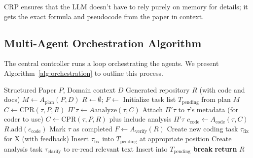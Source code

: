 \documentclass{ieeeaccess}
\begin{document}
CRP ensures that the LLM doesn't have to rely purely on memory for details; it gets the exact formula and pseudocode from the paper in context.

\subsection{Multi-Agent Orchestration Algorithm}
The central controller runs a loop orchestrating the agents. We present Algorithm~\ref{alg:orchestration} to outline this process.

\begin{algorithm}[!t]
\caption{Dirac-Paper2Codes Orchestration Loop}
\label{alg:orchestration}
\begin{algorithmic}[1]
\Require Structured Paper $P$, Domain context $D$
\Ensure Generated repository $R$ (with code and docs)
\State $M \gets A_{\text{plan}}(P, D)$
\State $R \gets \emptyset$; \quad $F \gets {}$
\State Initialize task list $T_{\text{pending}}$ from plan $M$
\State $C \gets \text{CPR}(\tau, P, R)$
\State $\Pi'\tau \gets A{\text{analyze}}(\tau, C)$
\State Attach $\Pi'\tau$ to $\tau$'s metadata (for coder to use)
\State $C \gets \text{CPR}(\tau, P, R)$ plus include analysis $\Pi'\tau$
\State $c_{\text{code}} \gets A_{\text{code}}(\tau, C)$
\State $R.\text{add}(c_{\text{code}})$
\EndIf
\State Mark $\tau$ as completed
\EndFor
\State $F \gets A_{\text{verify}}(R)$
\State Create new coding task $\tau_{\text{fix}}$ for X (with feedback)
\State Insert $\tau_{\text{fix}}$ into $T_{\text{pending}}$ at appropriate position
\State Create analysis task $\tau_{\text{clarify}}$ to re-read relevant text
\State Insert into $T_{\text{pending}}$
\EndIf
\EndFor
\Else
\State \textbf{break}
\EndIf
\EndWhile
\State \textbf{return} $R$
\end{algorithmic}
\end{algorithm}
\end{document}
